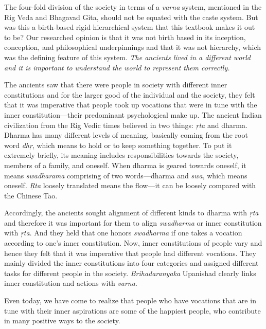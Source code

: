 The four-fold division of the society in terms of a \textit{varna} system, mentioned in the Rig Veda and Bhagavad Gita, should not be equated with the caste system. But was this a birth-based rigid hierarchical system that this textbook makes it out to be? Our researched opinion is that it was not birth based in its inception, conception, and philosophical underpinnings and that it was not hierarchy, which was the defining feature of this system. \textit{The ancients lived in a different world and it is important to understand the world to represent them correctly.} 

The ancients saw that there were people in society with different inner constitutions and for the larger good of the individual and the society, they felt that it was imperative that people took up vocations that were in tune with the inner constitution—their predominant psychological make up. The ancient Indian civilization from the Rig Vedic times believed in two things: \textit{ŗta} and dharma. Dharma has many different levels of meaning, basically coming from the root word \textit{dhŗ},  which means to hold or to keep something together. To put it extremely briefly, its meaning includes responsibilities towards the society, members of a family, and oneself. When dharma is geared towards oneself, it means \textit{swadharama} comprising of two words—dharma and \textit{swa},  which means oneself. \textit{Ŗta} loosely translated means the flow—it can be loosely compared with the Chinese Tao. 

Accordingly, the ancients sought alignment of different kinds to dharma with \textit{ŗta} and therefore it was important for them to align \textit{swadharma} or inner constitution with \textit{ŗta}. And they held that one honors \textit{swadharma} if one takes a vocation according to one’s inner constitution. Now, inner constitutions of people vary and hence they felt that it was imperative that people had different vocations. They mainly divided the inner constitutions into four categories and assigned different tasks for different people in the society. \textit{Brihadaranyaka} Upanishad clearly links inner constitution and actions with \textit{varna}. 

Even today, we have come to realize that people who have vocations that are in tune with their inner aspirations are some of the happiest people, who contribute in many positive ways to the society. 

